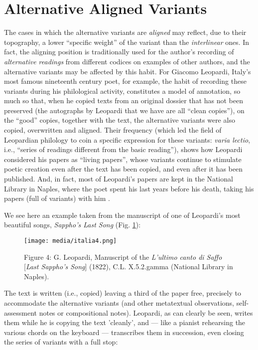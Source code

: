 \documentclass{article}
\begin{document}
\section{Alternative Aligned Variants}

The cases in which the alternative variants are \emph{aligned} may
reflect, due to their topography, a lower ``specific weight'' of the
variant than the \emph{interlinear} ones. In fact, the aligning position
is traditionally used for the author's recording of \emph{alternative
readings} from different codices on examples of other authors, and the
alternative variants may be affected by this habit. For Giacomo
Leopardi, Italy's most famous nineteenth century poet, for example, the habit of
recording these variants during his philological activity, constitutes a
model of annotation, so much so that, when he copied texts from an
original dossier that has not been preserved (the autographs by Leopardi
that we have are all ``clean copies''), on the ``good'' copies, together
with the text, the alternative variants were also copied, overwritten
and aligned. Their frequency (which led the field of Leopardian
philology to coin a specific expression for these variants: \emph{varia
lectio}, i.e., ``series of readings different from the basic reading''),
shows how Leopardi considered his papers as ``living papers'', whose
variants continue to stimulate poetic creation even after the text has
been copied, and even after it has been published. And, in fact, most of
Leopardi's papers are kept in the National Library in Naples, where the
poet spent his last years before his death, taking his papers (full of
variants) with him \parencite{italia_lo_2019}.

We see here an example taken from the manuscript of one of Leopardi's
most beautiful songs, \emph{Sappho's Last Song} (Fig. \ref{fig:italia4}):

\begin{figure}[H]
    \centering
    \texttt{[image: media/italia4.png]}
    \caption{Figure 4: G. Leopardi, Manuscript of the \emph{L'ultimo canto di Saffo}
[\emph{Last Sappho's Song}] (1822), C.L. X.5.2.gamma (National Library
in Naples).}
    \label{fig:italia4}
\end{figure}

\noindent The text is written (i.e., copied) leaving a third of the paper free,
precisely to accommodate the alternative variants (and other metatextual
observations, self-assessment notes or compositional notes). Leopardi,
as can clearly be seen, writes them while he is copying the text
'cleanly', and –– like a pianist rehearsing the various chords on the
keyboard –– transcribes them in succession, even closing the series of
variants with a full stop:
\end{document}
